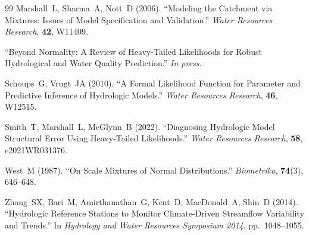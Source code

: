 \documentclass[article,nojss]{jss}
\begin{document}
\begin{thebibliography}{99}
  Marshall~L, Sharma~A, Nott~D (2006).
  \newblock ``Modeling the Catchment via Mixtures: Issues of Model
             Specification and Validation.''
  \newblock \emph{Water Resources Research}, \textbf{42}, W11409.

  \newblock ``Beyond Normality: A Review of Heavy-Tailed Likelihoods for
             Robust Hydrological and Water Quality Prediction.''
  \newblock \emph{In press}.

  Schoups~G, Vrugt~JA (2010).
  \newblock ``A Formal Likelihood Function for Parameter and Predictive
             Inference of Hydrologic Models.''
  \newblock \emph{Water Resources Research}, \textbf{46}, W12515.

  Smith~T, Marshall~L, McGlynn~B (2022).
  \newblock ``Diagnosing Hydrologic Model Structural Error Using
             Heavy-Tailed Likelihoods.''
  \newblock \emph{Water Resources Research}, \textbf{58}, e2021WR031376.

  West~M (1987).
  \newblock ``On Scale Mixtures of Normal Distributions.''
  \newblock \emph{Biometrika}, \textbf{74}(3), 646--648.

  Zhang~SX, Bari~M, Amirthanathan~G, Kent~D, MacDonald~A, Shin~D (2014).
  \newblock ``Hydrologic Reference Stations to Monitor Climate-Driven
             Streamflow Variability and Trends.''
  \newblock In \emph{Hydrology and Water Resources Symposium 2014},
             pp.~1048--1055.

\end{thebibliography}
\end{document}
